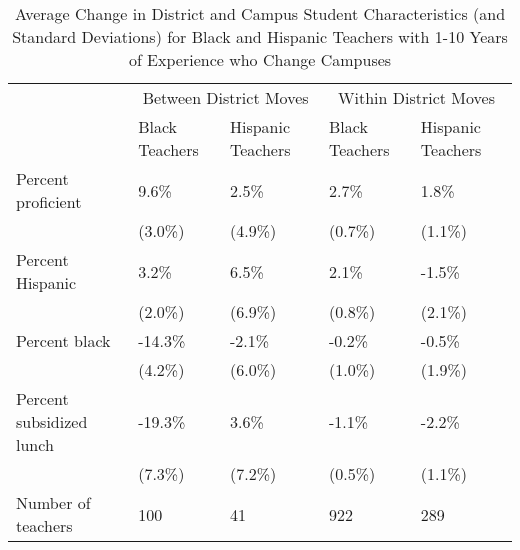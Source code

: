 \documentclass[]{article}
\begin{document}
\begin{table}[ht]
\centering
\begin{tabular}{lp{}p{}p{}p{}}
  \hline
 & \multicolumn{2}{c}{Between District Moves} & \multicolumn{2}{c}{Within District Moves}\\ \cline{2-5}
 & Black Teachers & Hispanic Teachers & Black Teachers & Hispanic Teachers \\
  \hline
Percent proficient & 9.6\% & 2.5\% & 2.7\% & 1.8\% \\ 
   & (3.0\%) & (4.9\%) & (0.7\%) & (1.1\%) \\ 
  Percent Hispanic & 3.2\% & 6.5\% & 2.1\% & -1.5\% \\ 
   & (2.0\%) & (6.9\%) & (0.8\%) & (2.1\%) \\ 
  Percent black & -14.3\% & -2.1\% & -0.2\% & -0.5\% \\ 
   & (4.2\%) & (6.0\%) & (1.0\%) & (1.9\%) \\ 
  Percent subsidized lunch & -19.3\% & 3.6\% & -1.1\% & -2.2\% \\ 
   & (7.3\%) & (7.2\%) & (0.5\%) & (1.1\%) \\ 
  Number of teachers & 100 & 41 & 922 & 289 \\ 
   \hline
\end{tabular}
\caption{Average Change in District and Campus Student Characteristics (and Standard Deviations) for Black and Hispanic Teachers with 1-10 Years of Experience who Change Campuses} 
\label{tbl:change_by_eth}
\end{table}
\end{document}
